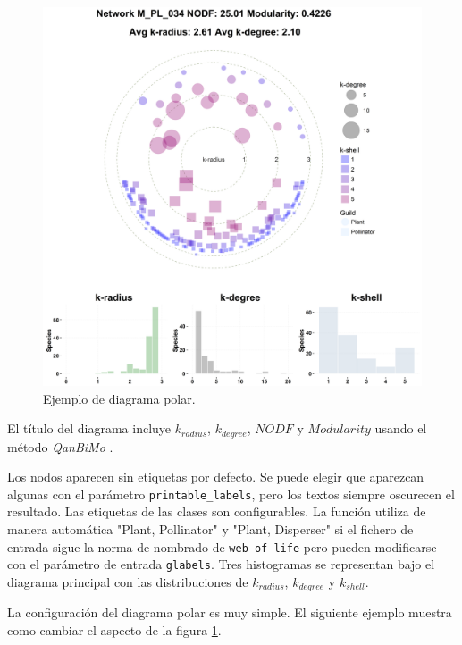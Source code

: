 \begin{figure}[h!]
\centering
\includegraphics[scale=0.43]{ManFigs/M_PL_034_polar.png}
\caption {Ejemplo de diagrama polar.}
\label{fig:AKMAN_M_PL_034_polar}
\end{figure}

El título del diagrama incluye $\overline{k}_{radius}$, $\overline {k}_{degree}$, $NODF$ \cite{almeida2008consistent} y $Modularity$ usando el método \textit{QanBiMo} \cite{dormann2014method}.

Los nodos aparecen sin etiquetas por defecto. Se puede elegir que aparezcan algunas con el parámetro \texttt{printable\_labels}, pero los textos siempre oscurecen el resultado. Las etiquetas de las clases son configurables. La función utiliza de manera automática "Plant, Pollinator" y "Plant, Disperser" si el fichero de entrada sigue la norma de nombrado de \texttt{web of life} pero pueden modificarse con el parámetro de entrada \texttt{glabels}. Tres histogramas se representan bajo el diagrama principal con las distribuciones de $k_{radius}$, $k_{degree}$ y $k_{shell}$. 

La configuración del diagrama polar es muy simple. El siguiente ejemplo muestra como cambiar el aspecto de la figura \ref{fig:AKMAN_M_PL_034_polar}.

